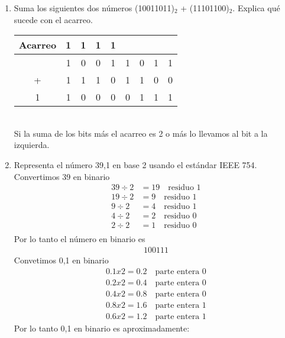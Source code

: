 \documentclass{article}
\begin{document}
\begin{enumerate}
    \item Suma los siguientes dos números (10011011)$_2$ + (11101100)$_2$. Explica qué sucede con el acarreo. \\
    \begin{table}[h]
    \begin{center}
        \begin{tabular}{|c c c c c c c c c|} \hline
        Acarreo & 1 & 1 & 1 & 1 &  &  &  & \\ \hline
          & 1 & 0 & 0 & 1 & 1 & 0 & 1 & 1\\ 
        + & 1 & 1 & 1 & 0 & 1 & 1 & 0 & 0\\ \hline
         1 & 1 & 0 & 0 & 0 & 0 & 1 & 1 & 1\\ \hline
    \end{tabular}
    \end{center}
    \end{table} \\
    Si la suma de los bits más el acarreo es 2 o más lo llevamos al bit a la izquierda.
    \item Representa el número 39,1 en base 2 usando el estándar IEEE 754.
    Convertimos 39 en binario
    \begin{align*}
    39 \div 2 &= 19 \quad \text{residuo } 1 \\
    19 \div 2 &= 9 \quad \text{residuo } 1 \\
    9 \div 2 &= 4 \quad \text{residuo } 1 \\
    4 \div 2 &= 2 \quad \text{residuo } 0 \\
    2 \div 2 &= 1 \quad \text{residuo } 0 \\
    \end{align*}
    Por lo tanto el número en binario es
    \begin{align*}
        100111
    \end{align*}
    Convetimos 0,1 en binario
    \begin{align*}
        0.1 x 2 = 0.2 \quad \text{parte entera } 0\\
        0.2 x 2 = 0.4 \quad \text{parte entera } 0\\
        0.4 x 2 = 0.8 \quad \text{parte entera } 0\\
        0.8 x 2 = 1.6 \quad \text{parte entera } 1 \\
        0.6 x 2 = 1.2 \quad \text{parte entera } 1
    \end{align*}
    Por lo tanto 0,1 en binario es aproximadamente:
    \begin{align*}

\end{align*}
\end{enumerate}
\end{document}
